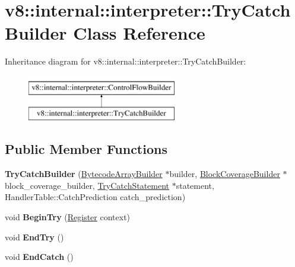 \hypertarget{classv8_1_1internal_1_1interpreter_1_1TryCatchBuilder}{}\section{v8\+:\+:internal\+:\+:interpreter\+:\+:Try\+Catch\+Builder Class Reference}
\label{classv8_1_1internal_1_1interpreter_1_1TryCatchBuilder}
Inheritance diagram for v8\+:\+:internal\+:\+:interpreter\+:\+:Try\+Catch\+Builder\+:\begin{figure}[H]
\begin{center}
\leavevmode
\includegraphics[height=2.000000cm]{classv8_1_1internal_1_1interpreter_1_1TryCatchBuilder}
\end{center}
\end{figure}
\subsection*{Public Member Functions}
\begin{DoxyCompactItemize}
\item 
\mbox{\label{classv8_1_1internal_1_1interpreter_1_1TryCatchBuilder_a260e40564db717e8b2bc9f41c37c3f3b}} 
{\bfseries Try\+Catch\+Builder} (\mbox{\hyperlink{classv8_1_1internal_1_1interpreter_1_1BytecodeArrayBuilder}{Bytecode\+Array\+Builder}} $\ast$builder, \mbox{\hyperlink{classv8_1_1internal_1_1interpreter_1_1BlockCoverageBuilder}{Block\+Coverage\+Builder}} $\ast$block\+\_\+coverage\+\_\+builder, \mbox{\hyperlink{classv8_1_1internal_1_1TryCatchStatement}{Try\+Catch\+Statement}} $\ast$statement, Handler\+Table\+::\+Catch\+Prediction catch\+\_\+prediction)
\item 
\mbox{\label{classv8_1_1internal_1_1interpreter_1_1TryCatchBuilder_aca60a78b65213eb139ea8063b779e35a}} 
void {\bfseries Begin\+Try} (\mbox{\hyperlink{classv8_1_1internal_1_1interpreter_1_1Register}{Register}} context)
\item 
\mbox{\label{classv8_1_1internal_1_1interpreter_1_1TryCatchBuilder_ad0b458d1a6b55141c7ff60f2c4b47282}} 
void {\bfseries End\+Try} ()
\item 
\mbox{\label{classv8_1_1internal_1_1interpreter_1_1TryCatchBuilder_ac32fb3b84609c3bf3f8b86dbc43664a6}} 
void {\bfseries End\+Catch} ()
\end{DoxyCompactItemize}
